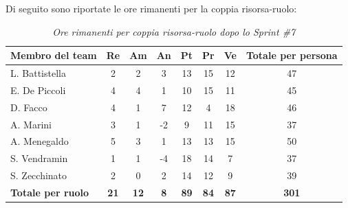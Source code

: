 \documentclass[a4paper, 10pt, colorlinks=true, linkcolor=black, urlcolor=blue, citecolor=blue, hidelinks]{article}
\renewcommand{\arraystretch}{1.2}
\begin{document}
Di seguito sono riportate le ore rimanenti per la coppia risorsa-ruolo:

\begin{table}[H]
    \centering
    \renewcommand{\arraystretch}{1.4}
    \begin{tabular}{|l|c|c|c|c|c|c|c|}
        \hline
        \rowcolor{bluBitless!15}
        \textbf{Membro del team} & \textbf{Re} & \textbf{Am} & \textbf{An} & \textbf{Pt} & \textbf{Pr} & \textbf{Ve} & \textbf{Totale per persona} \\
        \hline
        L. Battistella & 2 & 2 & 3 & 13 & 15 & 12 & 47 \\ \hline
        E. De Piccoli & 4 & 4 & 1 & 10 & 15 & 11 & 45 \\ \hline
        D. Facco & 4 & 1 & 7 & 12 & 4 & 18 & 46 \\ \hline
        A. Marini & 3 & 1 & -2 & 9 & 11 & 15 & 37 \\ \hline
        A. Menegaldo & 5 & 3 & 1 & 13 & 13 & 15 & 50 \\ \hline
        S. Vendramin & 1 & 1 & -4 & 18 & 14 & 7 & 37 \\ \hline
        S. Zecchinato & 2 & 0 & 2 & 14 & 12 & 9 & 39 \\ \hline
        \rowcolor{bluBitless!8}
        \textbf{Totale per ruolo} & \textbf{21} & \textbf{12} & \textbf{8} & \textbf{89} & \textbf{84} & \textbf{87} & \textbf{301} \\
        \hline
    \end{tabular}
    \caption{\textit{Ore rimanenti per coppia risorsa-ruolo dopo lo Sprint \#7}}
\end{table}
\end{document}
